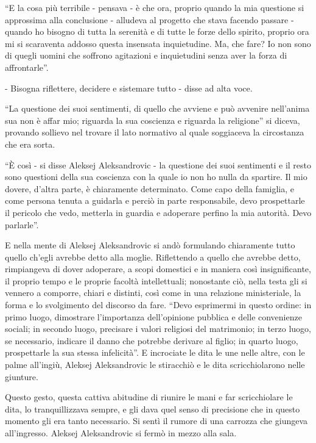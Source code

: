 ``E la cosa più terribile - pensava - è che ora, proprio quando la mia questione si approssima alla conclusione - alludeva al progetto che stava facendo passare - quando ho bisogno di tutta la serenità e di tutte le forze dello spirito, proprio ora mi si scaraventa addosso questa insensata inquietudine. Ma, che fare? Io non sono di quegli uomini che soffrono agitazioni e inquietudini senza aver la forza di affrontarle''. 

- Bisogna riflettere, decidere e sistemare tutto - disse ad alta voce. 

``La questione dei suoi sentimenti, di quello che avviene e può avvenire nell'anima sua non è affar mio; riguarda la sua coscienza e riguarda la religione'' si diceva, provando sollievo nel trovare il lato normativo al quale soggiaceva la circostanza che era sorta. 

``È così - si disse Aleksej Aleksandrovic - la questione dei suoi sentimenti e il resto sono questioni della sua coscienza con la quale io non ho nulla da spartire. Il mio dovere, d'altra parte, è chiaramente determinato. Come capo della famiglia, e come persona tenuta a guidarla e perciò in parte responsabile, devo prospettarle il pericolo che vedo, metterla in guardia e adoperare perfino la mia autorità. Devo parlarle''. 

E nella mente di Aleksej Aleksandrovic si andò formulando chiaramente tutto quello ch'egli avrebbe detto alla moglie. Riflettendo a quello che avrebbe detto, rimpiangeva di dover adoperare, a scopi domestici e in maniera così insignificante, il proprio tempo e le proprie facoltà intellettuali; nonostante ciò, nella testa gli si vennero a comporre, chiari e distinti, così come in una relazione ministeriale, la forma e lo svolgimento del discorso da fare. ``Devo esprimermi in questo ordine: in primo luogo, dimostrare l'importanza dell'opinione pubblica e delle convenienze sociali; in secondo luogo, precisare i valori religiosi del matrimonio; in terzo luogo, se necessario, indicare il danno che potrebbe derivare al figlio; in quarto luogo, prospettarle la sua stessa infelicità''. E incrociate le dita le une nelle altre, con le palme all'ingiù, Aleksej Aleksandrovic le stiracchiò e le dita scricchiolarono nelle giunture. 

Questo gesto, questa cattiva abitudine di riunire le mani e far scricchiolare le dita, lo tranquillizzava sempre, e gli dava quel senso di precisione che in questo momento gli era tanto necessario. Si sentì il rumore di una carrozza che giungeva all'ingresso. Aleksej Aleksandrovic si fermò in mezzo alla sala. 

